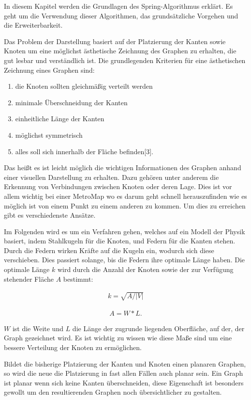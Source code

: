 In diesem Kapitel werden die Grundlagen des Spring-Algorithmus erklärt. 
Es geht um die Verwendung dieser Algorithmen, das grundsätzliche Vorgehen
und die Erweiterbarkeit.


Das Problem der Darstellung basiert auf der Platzierung der Kanten sowie
Knoten um eine möglichst ästhetische Zeichnung des
Graphen zu erhalten, die gut lesbar und verständlich ist. Die grundlegenden Kriterien für eine ästhetischen Zeichnung eines Graphen sind:
\begin{enumerate}
	\item die Knoten sollten gleichmäßig verteilt werden
	\item minimale Überschneidung der Kanten
	\item einheitliche Länge der Kanten
	\item möglichst symmetrisch
	\item alles soll sich innerhalb der Fläche befinden[3].
\end{enumerate}   

Das heißt es ist leicht möglich
die wichtigen Informationen des Graphen anhand einer visuellen Darstellung zu erhalten. 
Dazu gehören unter anderem die Erkennung von Verbindungen zwischen Knoten oder deren Lage. Dies
ist vor allem wichtig bei einer MetroMap wo es darum geht schnell herauszufinden wie es möglich ist
von einem Punkt zu einem anderen zu kommen.
Um dies zu erreichen gibt es verschiedenste Ansätze.

Im Folgenden wird es um ein Verfahren gehen, welches auf ein Modell
der Physik basiert, indem Stahlkugeln für die Knoten, und Federn für die Kanten stehen. Durch die 
Federn wirken Kräfte auf die Kugeln ein, wodurch sich diese verschieben. Dies passiert solange, 
bis die Federn ihre optimale Länge haben. Die optimale Länge $k$ wird durch die Anzahl der Knoten sowie
der zur Verfügung stehender Fläche $A$ bestimmt:

    \begin{align}
    	k =
    	\sqrt{A / |V|}
    \end{align}
    
    \begin{align}
    	A =
    	W * L.
    \end{align}

$W$ ist die Weite und $L$ die Länge der zugrunde liegenden Oberfläche, auf der, der Graph gezeichnet wird. Es ist
wichtig zu wissen wie diese Maße sind um eine bessere Verteilung der Knoten zu ermöglichen. 

Bildet die bisherige 
Platzierung der Kanten und Knoten einen planaren Graphen, so wird die neue die Platzierung in fast allen Fällen
auch planar sein. Ein Graph ist planar wenn sich keine Kanten überschneiden, diese Eigenschaft ist besonders gewollt um den resultierenden Graphen noch übersichtlicher zu gestalten.





